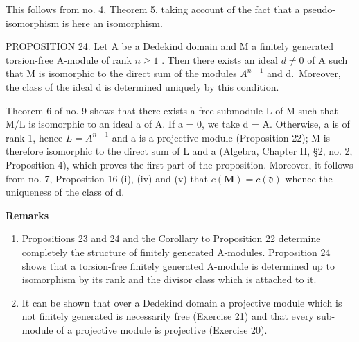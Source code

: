 This follows from no. 4, Theorem 5, taking account of the fact that a pseudo-isomorphism is here an isomorphism.

PROPOSITION 24. Let A be a Dedekind domain and M a finitely generated torsion-free A-module of rank \(n \geqslant 1\) . Then there exists an ideal \(d \neq 0\) of A such that M is isomorphic to the direct sum of the modules \(A^{n-1}\) and d.~Moreover, the class of the ideal d is determined uniquely by this condition.

Theorem 6 of no. 9 shows that there exists a free submodule L of M such that M/L is isomorphic to an ideal a of A. If a = 0, we take d = A. Otherwise, a is of rank 1, hence \(L = A^{n-1}\) and a is a projective module (Proposition 22); M is therefore isomorphic to the direct sum of L and a (Algebra, Chapter II, §2, no. 2, Proposition 4), which proves the first part of the proposition. Moreover, it follows from no. 7, Proposition 16 (i), (iv) and (v) that \(c(\mathbf{M}) = c(\mathfrak{d})\) whence the uniqueness of the class of d.

\textbf{Remarks}\par

\begin{enumerate}
\def\labelenumi{(\arabic{enumi})}
\item
  Propositions 23 and 24 and the Corollary to Proposition 22 determine completely the structure of finitely generated A-modules. Proposition 24 shows that a torsion-free finitely generated A-module is determined up to isomorphism by its rank and the divisor class which is attached to it.
\item
  It can be shown that over a Dedekind domain a projective module which is not finitely generated is necessarily free (Exercise 21) and that every sub-module of a projective module is projective (Exercise 20).
\end{enumerate}


